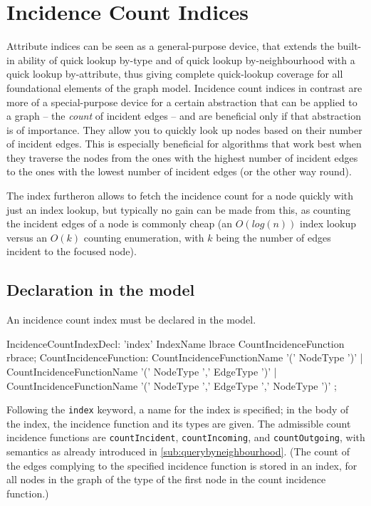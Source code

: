 \section{Incidence Count Indices}\label{sec:incidencecountindices}
Attribute indices can be seen as a general-purpose device, that extends the built-in ability of quick lookup by-type and of quick lookup by-neighbourhood with a quick lookup by-attribute, thus giving complete quick-lookup coverage for all foundational elements of the graph model.
Incidence count indices in contrast are more of a special-purpose device for a certain abstraction that can be applied to a graph -- the \emph{count} of incident edges -- and are beneficial only if that abstraction is of importance.
They allow you to quickly look up nodes based on their number of incident edges.
This is especially beneficial for algorithms that work best when they traverse the nodes from the ones with the highest number of incident edges to the ones with the lowest number of incident edges (or the other way round).

The index furtheron allows to fetch the incidence count for a node quickly with just an index lookup, 
but typically no gain can be made from this, as counting the incident edges of a node is commonly cheap (an $O(log(n))$ index lookup versus an $O(k)$ counting enumeration, with $k$ being the number of edges incident to the focused node).

\subsection*{Declaration in the model}

An incidence count index must be declared in the model.

\begin{rail}
IncidenceCountIndexDecl: 'index' IndexName lbrace CountIncidenceFunction rbrace;
CountIncidenceFunction: 
  CountIncidenceFunctionName '(' NodeType ')' |
  CountIncidenceFunctionName '(' NodeType ',' EdgeType ')' |
  CountIncidenceFunctionName '(' NodeType ',' EdgeType ',' NodeType ')'
  ;
\end{rail}\label{IncidenceCountIndexDecl}

Following the \texttt{index} keyword, a name for the index is specified; in the body of the index, the incidence function and its types are given.
The admissible count incidence functions are \texttt{countIncident}, \texttt{countIncoming}, and \texttt{countOutgoing}, with semantics as already introduced in \ref{sub:querybyneighbourhood}.
(The count of the edges complying to the specified incidence function is stored in an index, for all nodes in the graph of the type of the first node in the count incidence function.)

